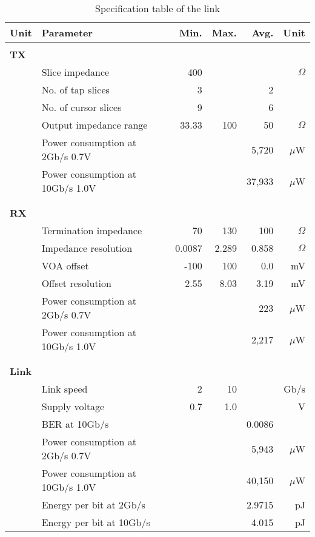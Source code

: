 \begin{table}[H]
  \centering
  \begin{tabular}{l l|r|r|r|r}
 Unit  & Parameter & Min. & Max. & Avg. & Unit \\
    \hline
    & & & & &\\
\textbf{TX} & & & & &\\
&	Slice impedance & 400 &  &  & $\Omega$\\
&	No. of tap slices & 3 &  & 2 & \\
&	No. of cursor slices & 9 &  & 6 & \\
&	Output impedance range & 33.33 & 100 & 50 & $\Omega$\\
&	Power consumption at 2Gb/s 0.7V &  &  & 5,720 & $\mu$W\\
&	Power consumption at 10Gb/s 1.0V &  &  & 37,933 & $\mu$W\\

    & & & & &\\
   	\hline
    & & & & &\\
\textbf{RX} & & & & &\\
&	Termination impedance & 70 & 130 & 100 & $\Omega$\\
&	Impedance resolution & 0.0087 & 2.289 & 0.858 & $\Omega$\\
&	VOA offset & -100 & 100 & 0.0 & mV\\
&	Offset resolution & 2.55 & 8.03 & 3.19 & mV\\
&	Power consumption at 2Gb/s 0.7V &  &  & 223  & $\mu$W\\
&	Power consumption at 10Gb/s 1.0V &&  &  2,217  & $\mu$W\\

    & & & & &\\
    \hline
    & & & & &\\
\textbf{Link} & & & & &\\
&	Link speed & 2 & 10 &  & Gb/s \\
&	Supply voltage  & 0.7 & 1.0 &  & V\\
&	BER at 10Gb/s  &  &  & 0.0086 & \\
&	Power consumption at 2Gb/s 0.7V &  &  & 5,943 & $\mu$W\\
&	Power consumption at 10Gb/s 1.0V &  &  & 40,150 & $\mu$W\\
&   Energy per bit at 2Gb/s &  & & 2.9715 & pJ \\
&   Energy per bit at 10Gb/s &  & & 4.015 & pJ \\
  \end{tabular}
  \caption{Specification table of the link}
  \label{tab:final_specifications}
\end{table}